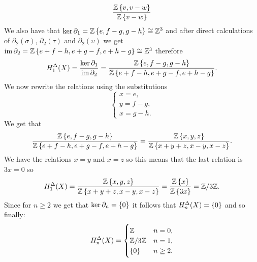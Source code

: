 \documentclass[11pt,a4paper]{article}
\begin{document}
\begin{solution}
\[    \frac{\mathbb{Z}\left\{v,v - w\right\}}{\mathbb{Z}\left\{v - w\right\}}
  \]
  We also have that $\ker \partial_1 = \mathbb{Z}\left\{e,f - g,g - h\right\} \cong \mathbb{Z}^3$
  and after direct calculations of $\partial_2(\sigma)$, $\partial_2(\tau)$
  and $\partial_2(\upsilon)$ we get
  $\operatorname{im} \partial_2 = \mathbb{Z}\left\{e + f - h, e + g - f, e + h - g\right\} \cong \mathbb{Z}^3$
  therefore
  \[
    H_1^{\Delta}(X) =
    \frac{\ker \partial_1}{\operatorname{im} \partial_2} =
    \frac{\mathbb{Z}\left\{e,f - g,g - h\right\}}{\mathbb{Z}\left\{e + f - h, e + g - f, e + h - g\right\}}.
  \]
  We now rewrite the relations using the substitutions
  \[
    \begin{cases}
      x = e, \\
      y = f - g, \\
      x = g - h.
    \end{cases}
  \]
  We get that
  \[
    \frac{\mathbb{Z}\left\{e,f - g,g - h\right\}}{\mathbb{Z}\left\{e + f - h, e + g - f, e + h - g\right\}} =
    \frac{\mathbb{Z}\left\{x,y,z\right\}}{\mathbb{Z}\left\{x + y + z, x - y, x - z\right\}}.
  \]
  We have the relations $x = y$ and $x = z$ so this means that the last
  relation is $3x = 0$ so
  \[
    H_1^{\Delta}(X) =
    \frac{\mathbb{Z}\left\{x,y,z\right\}}{\mathbb{Z}\left\{x + y + z, x - y, x - z\right\}} =
    \frac{\mathbb{Z}\left\{x\right\}}{\mathbb{Z}\left\{3x\right\}} = \mathbb{Z}/3\mathbb{Z}.
  \]
  Since for $n \geq 2$ we get that $\ker \partial_n = \left\{0\right\}$ it follows
  that $H_n^{\Delta}(X) = \left\{0\right\}$ and so finally:
  \[
    H^{\Delta}_n(X) =
    \begin{cases}
      \mathbb{Z} &n = 0, \\
      \mathbb{Z}/3\mathbb{Z} &n = 1, \\
      \left\{0\right\} &n \geq 2.
    \end{cases}
  \]
\end{solution}
\end{document}
